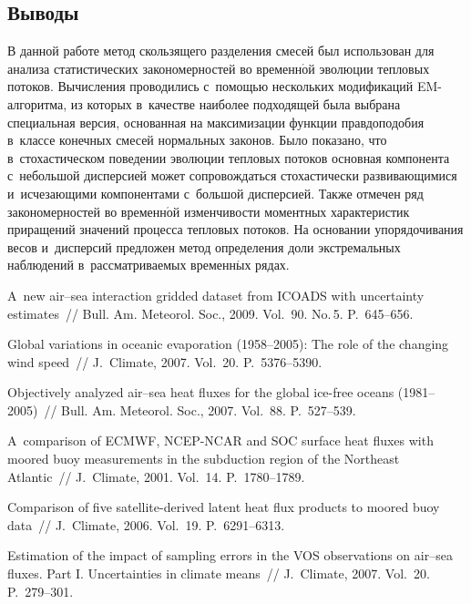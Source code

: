 \begin{multicols}{2}
\section{Выводы}

В данной работе метод скользящего разделения смесей был
использован для анализа статистических закономерностей во
временн$\acute{\mbox{о}}$й эволюции тепловых потоков. Вычисления проводились 
с~по\-мощью нескольких модификаций EM-алгоритма, из которых 
в~качестве наиболее подходящей была выбрана специальная версия,
основанная на максимизации функции правдоподобия в~классе
конечных смесей нормальных законов. Было показано, что 
в~стохастическом поведении эволюции тепловых потоков основная
компонента с~небольшой дисперсией может сопровождаться
стохастически развивающимися и~исчезающими компонентами 
с~большой дисперсией. Также отмечен ряд закономерностей во
временн$\acute{\mbox{о}}$й изменчивости моментных характеристик приращений
значений процесса теп\-ло\-вых потоков. На основании упорядочивания
весов и~дисперсий предложен метод определения доли
экстремальных наблюдений в~рас\-смат\-ри\-ва\-емых временн$\acute{\mbox{ы}}$х рядах.

{\small\frenchspacing
 {%
 \begin{thebibliography}{99}
 A~new air--sea
interaction gridded dataset from ICOADS with uncertainty
estimates~// Bull. Am. Meteorol. Soc., 2009.
Vol.~90. No.\,5. P.~645--656.

 Global variations in oceanic evaporation
(1958--2005): The role of the changing wind speed~// 
J.~Climate, 2007. Vol.~20. P.~5376--5390.

 Objectively analyzed air--sea
heat fluxes for the global ice-free oceans (1981--2005)~// Bull.
Am. Meteorol. Soc., 2007. Vol.~88. P.~527--539.

 A~comparison of ECMWF,
NCEP-NCAR and SOC surface heat fluxes with moored buoy measurements
in the subduction region of the Northeast Atlantic~// J.~Climate, 2001. Vol.~14. P.~1780--1789.

 Comparison of five
satellite-derived latent heat flux products to moored buoy data~//
J.~Climate, 2006. Vol.~19. P.~6291--6313.

Estimation of the impact of sampling errors in the VOS observations
on air--sea fluxes. Part I. Uncertainties in climate means~// J.~Climate, 2007. Vol.~20. P.~279--301.


\end{thebibliography}}}
\end{multicols}
